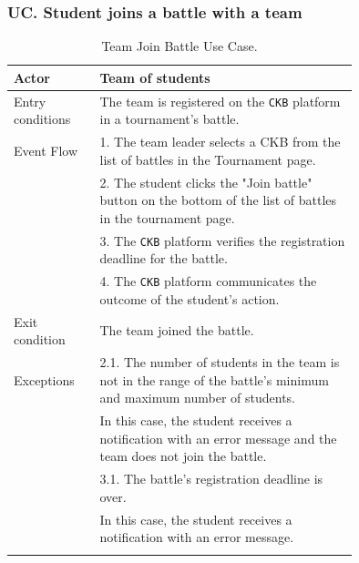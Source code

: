 \subsubsection*{UC\cuc . Student joins a battle with a team}
\begin{center}
    \begin{longtable}{lp{0.75\linewidth}}
        \hline
        Actor            & Team of students                                                                                                                                                                               \\
        \hline
        Entry conditions & The team is registered on the \verb|CKB| platform in a tournament's battle.                                                                                                            \\
        \hline
        Event Flow       
        & 1. The team leader selects a CKB from the list of battles in the Tournament page.\\
        & 2. The student clicks the "Join battle" button on the bottom of the list of battles in the tournament page.\\
        & 3. The \verb|CKB| platform verifies the registration deadline for the battle.\\
        & 4. The \verb|CKB| platform communicates the outcome of the student's action.\\
        \hline
        Exit condition   & The team joined the battle.   \\                                                                                                                                                                           
        \hline
        Exceptions   
        & 2.1. The number of students in the team is not in the range of the battle's minimum and maximum number of students.\\                                                                                                                                              
            & In this case, the student receives a notification with an error message and the team does not join the battle.   \\
        & 3.1. The battle's registration deadline is over.\\                                                                                                                                              
            & In this case, the student receives a notification with an error message.   \\                                                                
        \hline
        \caption{Team Join Battle Use Case.}
        \label{tab: team_join_battle_use_case}
    \end{longtable}


\end{center}
